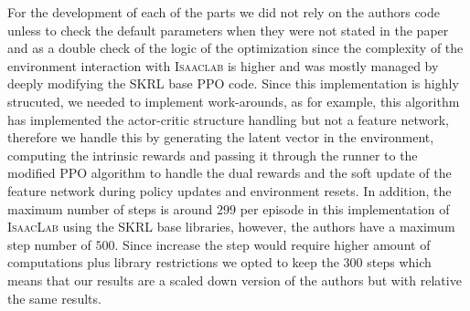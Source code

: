 \documentclass[10pt]{article} %
\begin{document}
For the development of each of the parts we did not rely on the authors code unless to check the default parameters when they were not stated in the paper and as a double check of the logic of the optimization since the complexity of the environment interaction with \textsc{Isaaclab} is higher and was mostly managed by deeply modifying the SKRL base \textsc{PPO} code. Since this implementation is highly strucuted, we needed to implement work-arounds, as for example, this algorithm has implemented the actor-critic structure handling but not a feature network, therefore we handle this by generating the latent vector in the environment, computing the intrinsic rewards and passing it through the runner to the modified \textsc{PPO} algorithm to handle the dual rewards and the soft update of the feature network during policy updates and environment resets. In addition, the maximum number of steps is around $299$ per episode in this implementation of \textsc{IsaacLab} using the SKRL base libraries, however, the authors have a maximum step number of $500$. Since increase the step would require higher amount of computations plus library restrictions we opted to keep the $300$ steps which means that our results are
a scaled down version of the authors but with relative the same results. 
\end{document}
